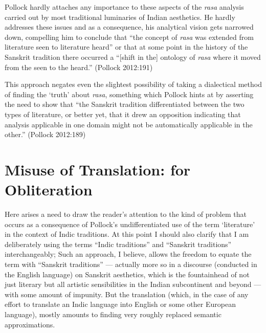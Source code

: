 Pollock hardly attaches any importance to these aspects of the \textsl{rasa} analysis carried out by most traditional luminaries of Indian aesthetics. He hardly addresses these issues and as a consequence, his analytical vision gets narrowed down, compelling him to conclude that “the concept of \textsl{rasa} was extended from literature seen to literature heard” or that at some point in the history of the Sanskrit tradition there occurred a “[shift in the] ontology of \textsl{rasa} where it moved from the seen to the heard.” (Pollock 2012:191) 

This approach negates even the slightest possibility of taking a dialectical method of finding the ‘truth’ about \textsl{rasa}, something which Pollock hints at by asserting the need to show that “the Sanskrit tradition differentiated between the two types of literature, or better yet, that it drew an opposition indicating that analysis applicable in one domain might not be automatically applicable in the other.” (Pollock 2012:189)\\[-21pt]

\section*{Misuse of Translation: for Obliteration}

Here arises a need to draw the reader’s attention to the kind of problem that occurs as a consequence of Pollock’s undifferentiated use of the term ‘literature’ in the context of Indic traditions. At this point I should also clarify that I am deliberately using the terms “Indic traditions” and “Sanskrit traditions” interchangeably; Such an approach, I believe, allows the freedom to equate the term with “Sanskrit traditions” --- actually more so in a discourse (conducted in the English language) on Sanskrit aesthetics, which is the fountainhead of not just literary but all artistic sensibilities in the Indian subcontinent and beyond --- with some amount of impunity. But the translation (which, in the case of any effort to translate an Indic language into English or some other European language), mostly amounts to finding very roughly replaced semantic approximations. 

